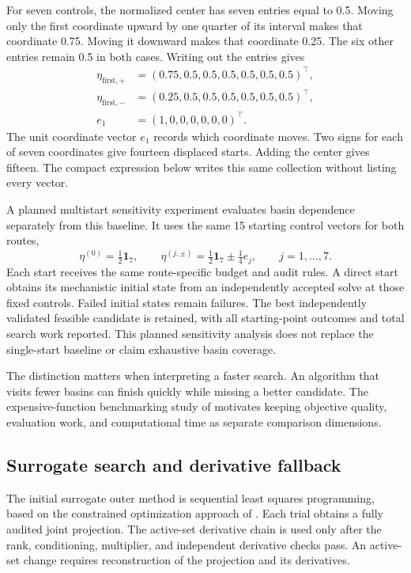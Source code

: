 For seven controls, the normalized center has seven entries equal to 0.5. Moving only the first coordinate upward by one quarter of its interval makes that coordinate 0.75. Moving it downward makes that coordinate 0.25. The six other entries remain 0.5 in both cases. Writing out the entries gives
\[
\begin{aligned}
\eta_{\mathrm{first},+}&=(0.75,0.5,0.5,0.5,0.5,0.5,0.5)^\top,\\
\eta_{\mathrm{first},-}&=(0.25,0.5,0.5,0.5,0.5,0.5,0.5)^\top,\\
e_1&=(1,0,0,0,0,0,0)^\top.
\end{aligned}
\]
The unit coordinate vector $e_1$ records which coordinate moves. Two signs for each of seven coordinates give fourteen displaced starts. Adding the center gives fifteen. The compact expression below writes this same collection without listing every vector.

A planned multistart sensitivity experiment evaluates basin dependence separately from this baseline. It uses the same 15 starting control vectors for both routes,
\begin{equation}
\eta^{(0)}=\tfrac12\mathbf1_7,\qquad
\eta^{(j,\pm)}=\tfrac12\mathbf1_7\pm\tfrac14e_j,
\qquad j=1,\ldots,7.
\label{eq:plant_multistart_design}
\end{equation}
Each start receives the same route-specific budget and audit rules. A direct start obtains its mechanistic initial state from an independently accepted solve at those fixed controls. Failed initial states remain failures. The best independently validated feasible candidate is retained, with all starting-point outcomes and total search work reported. This planned sensitivity analysis does not replace the single-start baseline or claim exhaustive basin coverage.

The distinction matters when interpreting a faster search. An algorithm that visits fewer basins can finish quickly while missing a better candidate. The expensive-function benchmarking study of \citet{Bliek2023} motivates keeping objective quality, evaluation work, and computational time as separate comparison dimensions.

\subsection{Surrogate search and derivative fallback}

The initial surrogate outer method is sequential least squares programming, based on the constrained optimization approach of \citet{Kraft1988}. Each trial obtains a fully audited joint projection. The active-set derivative chain is used only after the rank, conditioning, multiplier, and independent derivative checks pass. An active-set change requires reconstruction of the projection and its derivatives.

